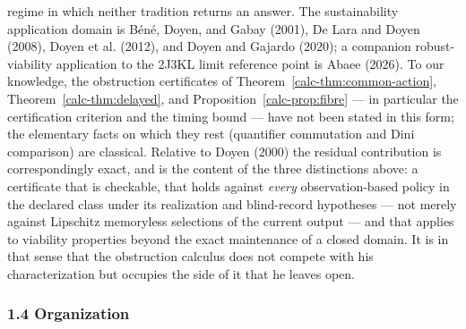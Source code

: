 \documentclass[10pt,twocolumn]{article}
\theoremstyle{definition}
\begin{document}
regime in which neither tradition returns an answer. The sustainability application domain is B\'en\'e, Doyen, and Gabay (2001), De Lara and Doyen (2008), Doyen et al. (2012), and Doyen and Gajardo (2020); a companion robust-viability application to the 2J3KL limit reference point is Abaee (2026). To our knowledge, the obstruction certificates of Theorem~\ref{calc-thm:common-action}, Theorem~\ref{calc-thm:delayed}, and Proposition~\ref{calc-prop:fibre} --- in particular the certification criterion and the timing bound --- have not been stated in this form; the elementary facts on which they rest (quantifier commutation and Dini comparison) are classical. Relative to Doyen (2000) the residual contribution is correspondingly exact, and is the content of the three distinctions above: a certificate that is checkable, that holds against \emph{every} observation-based policy in the declared class under its realization and blind-record hypotheses --- not merely against Lipschitz memoryless selections of the current output --- and that applies to viability properties beyond the exact maintenance of a closed domain. It is in that sense that the obstruction calculus does not compete with his characterization but occupies the side of it that he leaves open.

\subsubsection{1.4 Organization}\label{calc-organization}
\end{document}
